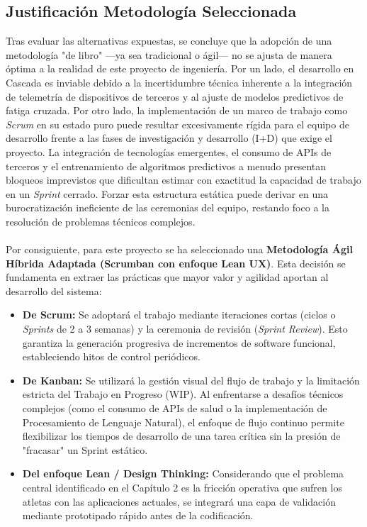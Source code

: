 \documentclass[12pt]{article}
\begin{document}
\subsection{Justificación Metodología Seleccionada}

Tras evaluar las alternativas expuestas, se concluye que la adopción de una metodología "de libro" ---ya sea tradicional o ágil--- no se ajusta de manera óptima a la realidad de este proyecto de ingeniería. Por un lado, el desarrollo en Cascada es inviable debido a la incertidumbre técnica inherente a la integración de telemetría de dispositivos de terceros y al ajuste de modelos predictivos de fatiga cruzada. Por otro lado, la implementación de un marco de trabajo como \textit{Scrum} en su estado puro puede resultar excesivamente rígida para el equipo de desarrollo frente a las fases de investigación y desarrollo (I+D) que exige el proyecto. La integración de tecnologías emergentes, el consumo de APIs de terceros y el entrenamiento de algoritmos predictivos a menudo presentan bloqueos imprevistos que dificultan estimar con exactitud la capacidad de trabajo en un \textit{Sprint} cerrado. Forzar esta estructura estática puede derivar en una burocratización ineficiente de las ceremonias del equipo, restando foco a la resolución de problemas técnicos complejos.
\\\\
Por consiguiente, para este proyecto se ha seleccionado una \textbf{Metodología Ágil Híbrida Adaptada (Scrumban con enfoque Lean UX)}. Esta decisión se fundamenta en extraer las prácticas que mayor valor y agilidad aportan al desarrollo del sistema:
\begin{itemize}
    \item \textbf{De Scrum:} Se adoptará el trabajo mediante iteraciones cortas (ciclos o \textit{Sprints} de 2 a 3 semanas) y la ceremonia de revisión (\textit{Sprint Review}). Esto garantiza la generación progresiva de incrementos de software funcional, estableciendo hitos de control periódicos.
    \item \textbf{De Kanban:} Se utilizará la gestión visual del flujo de trabajo y la limitación estricta del Trabajo en Progreso (WIP). Al enfrentarse a desafíos técnicos complejos (como el consumo de APIs de salud o la implementación de Procesamiento de Lenguaje Natural), el enfoque de flujo continuo permite flexibilizar los tiempos de desarrollo de una tarea crítica sin la presión de "fracasar" un Sprint estático.
    \item \textbf{Del enfoque Lean / Design Thinking:} Considerando que el problema central identificado en el Capítulo 2 es la fricción operativa que sufren los atletas con las aplicaciones actuales, se integrará una capa de validación mediante prototipado rápido antes de la codificación.
\end{itemize}
\newpage
\end{document}

